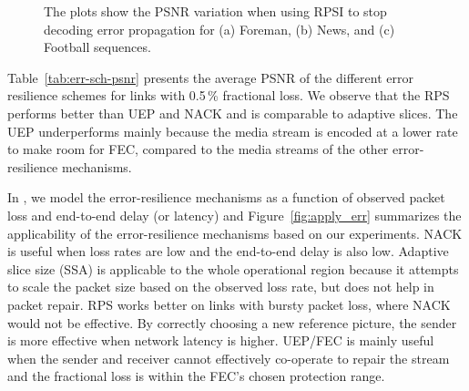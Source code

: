 \begin{figure}[!t]
  \centerline{
}
\caption{The plots show the PSNR variation when using RPSI to stop decoding
error propagation for (a) Foreman, (b) News, and (c) Football sequences.}
\label{fig:rpsi_sim}
\end{figure}

Table~\ref{tab:err-sch-psnr} presents the average PSNR of the different error
resilience schemes for links with 0.5\,\% fractional loss. We observe that the
RPS performs better than UEP and NACK and is comparable to adaptive slices.
The UEP underperforms mainly because the media stream is encoded at a lower
rate to make room for FEC, compared to the media streams of the other
error-resilience mechanisms.

\begin{table}
\caption{Comparing the performance of different error-resilience
schemes on three different types of YUV sequences~\cite{YUV_seq}. The link
loss rate is 0.5\,\% at each 3G link.}
\label{tab:err-sch-psnr}
\end{table}

In , we model the error-resilience mechanisms as a function of
observed packet loss and end-to-end delay (or latency) and
Figure~\ref{fig:apply_err} summarizes the applicability of the
error-resilience mechanisms based on our experiments. NACK is useful when loss
rates are low and the end-to-end delay is also low. Adaptive slice size (SSA)
is applicable to the whole operational region because it attempts to scale the
packet size based on the observed loss rate, but does not help in packet
repair. RPS works better on links with bursty packet loss, where NACK would
not be effective. By correctly choosing a new reference picture, the sender is
more effective when network latency is higher. UEP/FEC is mainly useful when
the sender and receiver cannot effectively co-operate to repair the stream and
the fractional loss is within the FEC's chosen protection range.

